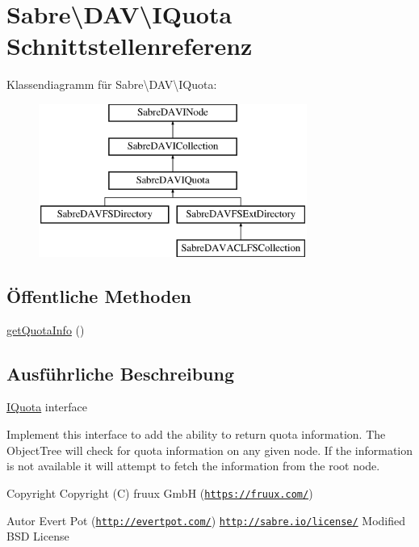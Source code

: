 \hypertarget{interface_sabre_1_1_d_a_v_1_1_i_quota}{}\section{Sabre\textbackslash{}D\+AV\textbackslash{}I\+Quota Schnittstellenreferenz}
\label{interface_sabre_1_1_d_a_v_1_1_i_quota}
Klassendiagramm für Sabre\textbackslash{}D\+AV\textbackslash{}I\+Quota\+:\begin{figure}[H]
\begin{center}
\leavevmode
\includegraphics[height=5.000000cm]{interface_sabre_1_1_d_a_v_1_1_i_quota}
\end{center}
\end{figure}
\subsection*{Öffentliche Methoden}
\begin{DoxyCompactItemize}
\item 
\mbox{\hyperlink{interface_sabre_1_1_d_a_v_1_1_i_quota_a38730776dffcebd1c486acaf1bf470e4}{get\+Quota\+Info}} ()
\end{DoxyCompactItemize}


\subsection{Ausführliche Beschreibung}
\mbox{\hyperlink{interface_sabre_1_1_d_a_v_1_1_i_quota}{I\+Quota}} interface

Implement this interface to add the ability to return quota information. The Object\+Tree will check for quota information on any given node. If the information is not available it will attempt to fetch the information from the root node.

\begin{DoxyCopyright}{Copyright}
Copyright (C) fruux GmbH (\href{https://fruux.com/}{\tt https\+://fruux.\+com/}) 
\end{DoxyCopyright}
\begin{DoxyAuthor}{Autor}
Evert Pot (\href{http://evertpot.com/}{\tt http\+://evertpot.\+com/})  \href{http://sabre.io/license/}{\tt http\+://sabre.\+io/license/} Modified B\+SD License 
\end{DoxyAuthor}


